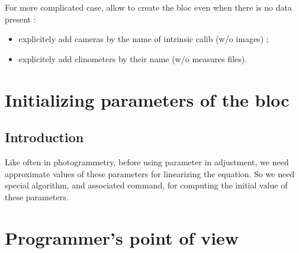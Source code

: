 For more complicated case, allow to create the bloc even when there is no data present : 

\begin{itemize}
    \item  explicitely  add cameras by the name of intrinsic calib (w/o images) ;
    \item  explicitely  add clinometers by their name  (w/o measures files).
\end{itemize}


\section{Initializing parameters of the bloc}

\subsection{Introduction}
Like often in photogrammetry, before using parameter in adjustment, we
need approximate values of these parameters for linearizing the equation.
So we need special algorithm, and associated command, for computing the
initial value of these parameters.


\section{Programmer's point of view}




